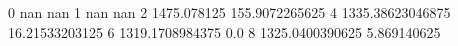 0 nan nan
1 nan nan
2 1475.078125 155.9072265625
4 1335.38623046875 16.21533203125
6 1319.1708984375 0.0
8 1325.0400390625 5.869140625
